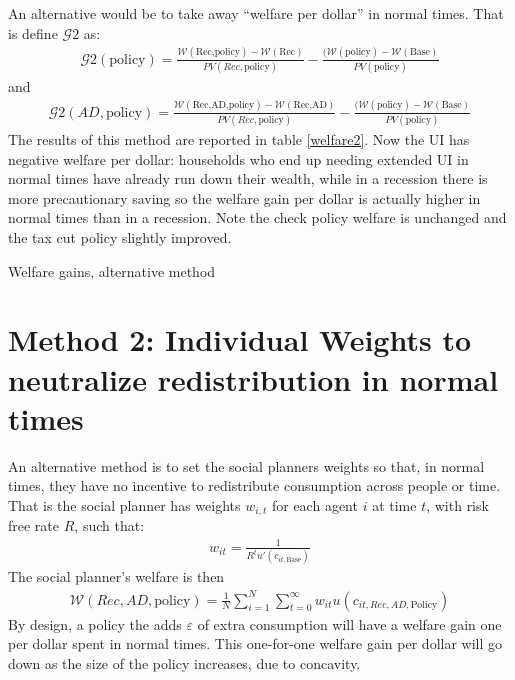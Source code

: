 \documentclass[11pt]{article}
\begin{document}
	An alternative would be to take away ``welfare per dollar'' in normal times. That is define $\mathcal{G}2$ as:
	\begin{align}
	\mathcal{G}2(\text{policy}) = \frac{\mathcal{W}(\text{Rec,policy}) - \mathcal{W}(\text{Rec})}{PV(Rec,\text{policy})}  - \frac{(\mathcal{W}(\text{policy}) - \mathcal{W}(\text{Base}) }{PV(\text{policy})}
\end{align}
and 
	\begin{align}
	\mathcal{G}2(AD,\text{policy}) = \frac{\mathcal{W}(\text{Rec,AD,policy}) - \mathcal{W}(\text{Rec,AD})}{PV(Rec,\text{policy})}  - \frac{(\mathcal{W}(\text{policy}) - \mathcal{W}(\text{Base}) }{PV(\text{policy})}
\end{align}	
The results of this method are reported in table \ref{welfare2}. Now the UI has negative welfare per dollar: households who end up needing extended UI in normal times have already run down their wealth, while in a recession there is more precautionary saving so the welfare gain per dollar is actually higher in normal times than in a recession. Note the check policy welfare is unchanged and the tax cut policy slightly improved.
	\begin{table} 
	\center
	
	\caption{Welfare gains, alternative method}
	\label{welfare2}
\end{table}

	\section{Method 2: Individual Weights to neutralize redistribution in normal times}
	An alternative method is to set the social planners weights so that, in normal times, they have no incentive to redistribute consumption across people or time. That is the social planner has weights $w_{i,t}$ for each agent $i$ at time $t$, with risk free rate $R$, such that:
	\begin{align}
		w_{it} = \frac{1}{R^t u'(c_{it,\text{Base}})}
	\end{align}
	The social planner's welfare is then
	\begin{align}
	\mathcal{W}(Rec,AD,\text{policy}) = \frac{1}{N}\sum_{i=1}^{N} \sum_{t=0}^{\infty} w_{it} u(c_{it,Rec,AD,\text{Policy}})
	\end{align}
	By design, a policy the adds $\varepsilon$ of extra consumption will have a welfare gain one per dollar spent in normal times. This one-for-one welfare gain per dollar will go down as the size of the policy increases, due to concavity.
	
\end{document}
